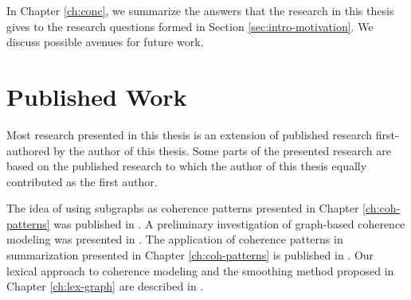 In Chapter \ref{ch:conc}, we summarize the answers that the research in this thesis gives to the research questions formed in Section \ref{sec:intro-motivation}. 
We discuss possible avenues for future work. 

\section{Published Work}
\label{sec:intro-published}

Most research presented in this thesis is an extension of published research first-authored by the author of this thesis. 
Some parts of the presented research are based on the published research to which the author of this thesis equally contributed as the first author. 

The idea of using subgraphs as coherence patterns presented in Chapter \ref{ch:coh-patterns} was published in . 
A preliminary investigation of graph-based coherence modeling was presented in . 
The application of coherence patterns in summarization presented in Chapter \ref{ch:coh-patterns} is published in . 
Our lexical approach to coherence modeling and the smoothing method proposed in Chapter \ref{ch:lex-graph} are described in .


